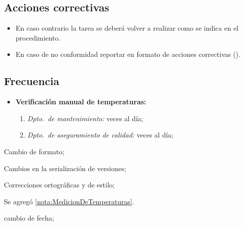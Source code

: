 \subsection{Acciones correctivas}

\begin{itemize}
	\item En caso contrario la tarea se deberá volver a realizar como se indica en el procedimiento.
	\item En caso de no conformidad reportar en formato de acciones correctivas (\IdFormAACC).
\end{itemize}

\subsection{Frecuencia}

\begin{itemize}
	\item \textbf{Verificación manual de temperaturas:}
		\begin{enumerate}
			\item \emph{Dpto.\ de mantenimiento:} \VecesTempManual veces al día;
			\item \emph{Dpto.\ de aseguramiento de calidad:} \VecesTempManual veces al día;
		\end{enumerate}
\end{itemize}

\begin{changelog}[simple, sectioncmd=\subsection*,label=changelog-2.3]

	\begin{version}[v=2.1, date=2023--01, author=Pablo E. Alanis]
		\item Cambio de formato;
		\item Cambios en la serialización de versiones;
		\item Correcciones ortográficas y de estilo;
		\item Se agregó \cref{nota:MedicionDeTemperaturas}.
	\end{version}

	\begin{version}[v=1.8, date=2022-05, author=Alonso M.]
		\item cambio de fecha;
	\end{version}

\end{changelog}